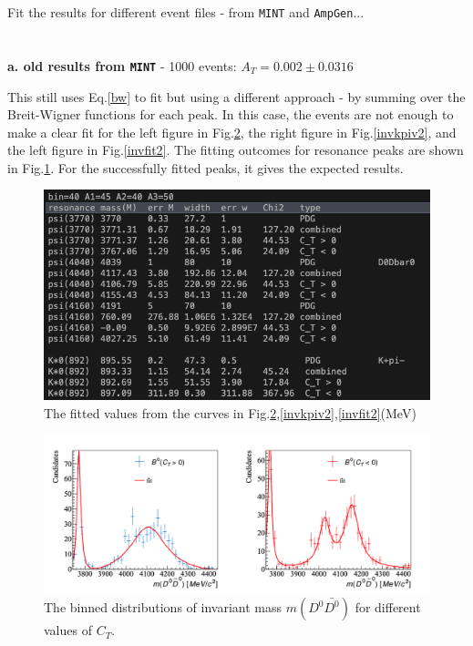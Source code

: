 Fit the results for different event files - from \texttt{MINT} and \texttt{AmpGen}... 
\\
\\
\\
\indent \textbf{a. old results from \texttt{MINT}} - 1000 events: $A_T= 0.002\pm0.0316$
\begin{itemize}
    This still uses Eq.\ref{bw} to fit but using a different approach - by summing over the Breit-Wigner functions for each peak. In this case, the events are not enough to make a clear fit for the left figure in Fig.\ref{invddv2}, the right figure in Fig.\ref{invkpiv2}, and the left figure in Fig.\ref{invfit2}. The fitting outcomes for resonance peaks are shown in Fig.\ref{ddkpi_fitdata}. For the successfully fitted peaks, it gives the expected results.
\end{itemize}
\begin{figure}[h]
\center
\includegraphics*[width=0.96\linewidth]{CM_variables_B0/B0_invmass_fit_output_1000}
\caption{The fitted values from the curves in Fig.\ref{invddv2},\ref{invkpiv2},\ref{invfit2}(MeV)}
\label{ddkpi_fitdata}
\end{figure}

\begin{figure}[h]
\center
\includegraphics*[width=0.96\linewidth]{CM_variables_B0/B0_invmass_D0Dbar0_fit_1000}
\caption{The binned distributions of invariant mass $m(D^0\bar{D^0})$ for different values of $C_T$.}
\label{invddv2}
\end{figure}

